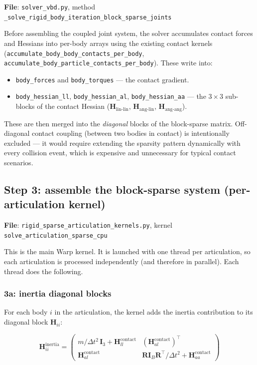 \documentclass[11pt,a4paper]{article}
\begin{document}
\textbf{File}: \texttt{solver\_vbd.py}, method
\texttt{\_solve\_rigid\_body\_iteration\_block\_sparse\_joints}

Before assembling the coupled joint system, the solver accumulates contact
forces and Hessians into per-body arrays using the existing contact kernels
(\texttt{accumulate\_body\_body\_contacts\_per\_body},
\texttt{accumulate\_body\_particle\_contacts\_per\_body}).  These write into:
\begin{itemize}[nosep]
  \item \texttt{body\_forces} and \texttt{body\_torques} — the contact gradient.
  \item \texttt{body\_hessian\_ll}, \texttt{body\_hessian\_al},
        \texttt{body\_hessian\_aa} — the $3\times 3$ sub-blocks of the contact
        Hessian ($\mathbf{H}_\text{lin-lin}$, $\mathbf{H}_\text{ang-lin}$,
        $\mathbf{H}_\text{ang-ang}$).
\end{itemize}

These are then merged into the \emph{diagonal} blocks of the block-sparse
matrix.  Off-diagonal contact coupling (between two bodies in contact) is
intentionally excluded — it would require extending the sparsity pattern
dynamically with every collision event, which is expensive and unnecessary for
typical contact scenarios.

\subsection{Step 3: assemble the block-sparse system (per-articulation kernel)}
\label{sec:assemble}

\textbf{File}: \texttt{rigid\_sparse\_articulation\_kernels.py},
kernel \texttt{solve\_articulation\_sparse\_cpu}

This is the main Warp kernel.  It is launched with one thread per
articulation, so each articulation is processed independently (and therefore
in parallel).  Each thread does the following.

\subsubsection{3a: inertia diagonal blocks}

For each body $i$ in the articulation, the kernel adds the inertia
contribution to its diagonal block $\mathbf{H}_{ii}$:

\begin{equation}
  \mathbf{H}_{ii}^\text{inertia}
  = \begin{pmatrix}
      m/\Delta t^2 \, \mathbf{I}_3 + \mathbf{H}^\text{contact}_{ll}
        & (\mathbf{H}^\text{contact}_{al})^\top \\
      \mathbf{H}^\text{contact}_{al}
        & \mathbf{R}\mathbf{I}_B\mathbf{R}^\top/\Delta t^2 + \mathbf{H}^\text{contact}_{aa}
    \end{pmatrix}
\end{equation}
\end{document}
